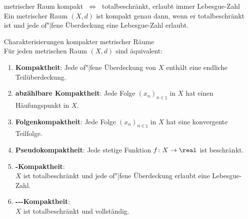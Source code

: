 \begin{Satz}{metrischer Raum kompakt $\;\Leftrightarrow\;$
             totalbeschränkt, erlaubt immer Lebesgue-Zahl}\\
    Ein metrischer Raum $(X, d)$ ist kompakt genau dann, wenn er
    totalbeschränkt ist und jede of"|fene Überdeckung eine Lebesgue-Zahl
    erlaubt.
\end{Satz}

\begin{Satz}{Charakterisierungen kompakter metrischer Räume}\\
    Für jeden metrischen Raum $(X, d)$ sind äquivalent:
    \begin{enumerate}
        \item
        \textbf{Kompaktheit}:
        Jede of"|fene Überdeckung von $X$ enthält eine endliche
        Teilüberdeckung.
        
        \item
        \textbf{abzählbare Kompaktheit}:
        Jede Folge $(x_n)_{n \in \natural}$ in $X$ hat einen Häufungspunkt
        in $X$.
        
        \item
        \textbf{Folgenkompaktheit}:
        Jede Folge $(x_n)_{n \in \natural}$ in $X$ hat eine konvergente
        Teilfolge.
        
        \item
        \textbf{Pseudokompaktheit}:
        Jede stetige Funktion $f\colon X \rightarrow \real$ ist beschränkt.
        
        \item
        \textbf{-Kompaktheit}: \\
        $X$ ist totalbeschränkt und jede of"|fene Überdeckung erlaubt eine
        Lebesgue-Zahl.
        
        \item
        \textbf{---Kompaktheit}: \\
        $X$ ist totalbeschränkt und vollständig.
    \end{enumerate}
\end{Satz}

